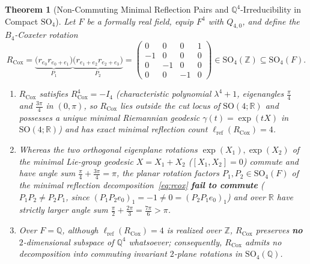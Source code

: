 \documentclass[11pt,a4paper]{article}
\theoremstyle{plain}
\newtheorem{theorem}{Theorem}[section]
\theoremstyle{definition}
\newcommand{\R}{\mathbb{R}}
\newcommand{\Q}{\mathbb{Q}}
\newcommand{\Z}{\mathbb{Z}}
\newcommand{\SO}{\mathrm{SO}}
\newcommand{\lref}{\ell_{\mathrm{ref}}}
\begin{document}
\begin{theorem}[Non-Commuting Minimal Reflection Pairs and $\Q^4$-Irreducibility in Compact $\SO_4$]
\label{thm:coxeter}
Let $F$ be a formally real field, equip $F^4$ with $Q_{4,0}$, and define the $B_4$-Coxeter rotation
\begin{equation}\label{eq:rcox}
  R_{\mathrm{Cox}} = \underbrace{\bigl(r_{e_0} r_{e_0 + e_1}\bigr)}_{P_1} \underbrace{\bigl(r_{e_1 + e_2} r_{e_2 + e_3}\bigr)}_{P_2}
  = \begin{pmatrix}
    0 & 0 & 0 & 1 \\
    -1 & 0 & 0 & 0 \\
    0 & -1 & 0 & 0 \\
    0 & 0 & -1 & 0
  \end{pmatrix} \in \SO_4(\Z) \subseteq \SO_4(F).
\end{equation}
\begin{enumerate}
\item $R_{\mathrm{Cox}}$ satisfies $R_{\mathrm{Cox}}^4 = -I_4$ (characteristic polynomial $\lambda^4 + 1$, eigenangles $\frac{\pi}{4}$ and $\frac{3\pi}{4}$ in $(0, \pi)$, so $R_{\mathrm{Cox}}$ lies outside the cut locus of $\SO(4; \R)$ and possesses a \emph{unique} minimal Riemannian geodesic $\gamma(t) = \exp(t X)$ in $\SO(4; \R)$) and has exact minimal reflection count $\lref(R_{\mathrm{Cox}}) = 4$.
\item Whereas the two orthogonal eigenplane rotations $\exp(X_1), \exp(X_2)$ of the minimal Lie-group geodesic $X = X_1 + X_2$ ($[X_1, X_2] = 0$) commute and have angle sum $\frac{\pi}{4} + \frac{3\pi}{4} = \pi$, the planar rotation factors $P_1, P_2 \in \SO_4(F)$ of the minimal reflection decomposition~\eqref{eq:rcox} \textbf{fail to commute} ($P_1 P_2 \neq P_2 P_1$, since $(P_1 P_2 e_0)_1 = -1 \neq 0 = (P_2 P_1 e_0)_1$) and over $\R$ have strictly larger angle sum $\frac{\pi}{2} + \frac{2\pi}{3} = \frac{7\pi}{6} > \pi$.
\item Over $F = \Q$, although $\lref(R_{\mathrm{Cox}}) = 4$ is realized over $\Z$, $R_{\mathrm{Cox}}$ preserves \textbf{no} $2$-dimensional subspace of $\Q^4$ whatsoever; consequently, $R_{\mathrm{Cox}}$ admits no decomposition into commuting invariant $2$-plane rotations in $\SO_4(\Q)$.
\end{enumerate}
\end{theorem}
\end{document}
